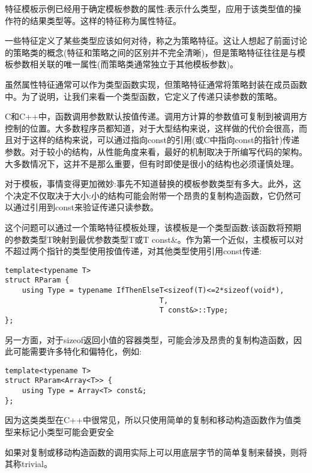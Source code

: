 
特征模板示例已经用于确定模板参数的属性:表示什么类型，应用于该类型值的操作符的结果类型等。这样的特征称为属性特征。

一些特征定义了某些类型应该如何对待，称之为策略特征。这让人想起了前面讨论的策略类的概念(特征和策略之间的区别并不完全清晰)，但是策略特征往往是与模板参数相关联的唯一属性(而策略类通常独立于其他模板参数)。

虽然属性特征通常可以作为类型函数实现，但策略特征通常将策略封装在成员函数中。为了说明，让我们来看一个类型函数，它定义了传递只读参数的策略。


C和C++中，函数调用参数默认按值传递。调用方计算的参数值可复制到被调用方控制的位置。大多数程序员都知道，对于大型结构来说，这样做的代价会很高，而且对于这样的结构来说，可以通过指向const的引用(或C中指向const的指针)传递参数。对于较小的结构，从性能角度来看，最好的机制取决于所编写代码的架构。大多数情况下，这并不是那么重要，但有时即使是很小的结构也必须谨慎处理。

对于模板，事情变得更加微妙:事先不知道替换的模板参数类型有多大。此外，这个决定不仅取决于大小:小的结构可能会附带一个昂贵的复制构造函数，它仍然可以通过引用到const来验证传递只读参数。

这个问题可以通过一个策略特征模板处理，该模板是一个类型函数:该函数将预期的参数类型T映射到最优参数类型T或T const\&。作为第一个近似，主模板可以对不超过两个指针的类型使用按值传递，对其他类型使用引用const传递:

\begin{lstlisting}[style=styleCXX]
template<typename T>
struct RParam {
	using Type = typename IfThenElseT<sizeof(T)<=2*sizeof(void*),
									T,
									T const&>::Type;
};
\end{lstlisting}

另一方面，对于sizeof返回小值的容器类型，可能会涉及昂贵的复制构造函数，因此可能需要许多特化和偏特化，例如:

\begin{lstlisting}[style=styleCXX]
template<typename T>
struct RParam<Array<T>> {
	using Type = Array<T> const&;
};
\end{lstlisting}

因为这类类型在C++中很常见，所以只使用简单的复制和移动构造函数作为值类型来标记小类型可能会更安全

\begin{tcolorbox}[colback=webgreen!5!white,colframe=webgreen!75!black]
\hspace*{0.75cm}如果对复制或移动构造函数的调用实际上可以用底层字节的简单复制来替换，则将其称trivial。
\end{tcolorbox}

